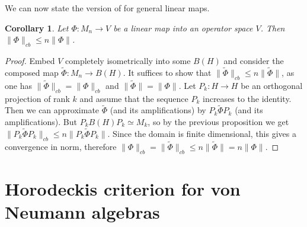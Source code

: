 \documentclass[11pt]{article}
\numberwithin{theorem}{section}
\newtheorem{corollary}[theorem]{Corollary}
\begin{document}
We can now state the version of \cite[Theorem 3.7]{aubrun} for general linear maps.
\begin{corollary}
Let $\Phi:M_n \to V$ be a linear map into an operator space $V$. Then $\|\Phi\|_{cb}\leqslant n \|\Phi\|$.
\end{corollary}
\begin{proof}
Embed $V$ completely isometrically into some $B(H)$ and consider the composed map $\widetilde{\Phi}: M_n \to B(H)$. It suffices to show that $\|\widetilde{\Phi}\|_{cb} \leqslant n \|\widetilde{\Phi}\|$, as one has $\|\widetilde{\Phi}\|_{cb} = \|\Phi\|_{cb}$ and $\|\widetilde{\Phi}\| = \|\Phi\|$. Let $P_{k}: H \to H$ be an orthogonal projection of rank $k$ and assume that the sequence $P_{k}$ increases to the identity. Then we can approximate $\widetilde{\Phi}$ (and its amplifications) by $P_{k}\widetilde{\Phi} P_{k}$ (and its amplifications). But $P_{k} B(H) P_{k} \simeq M_{k}$, so by the previous proposition we get $\|P_{k} \widetilde{\Phi}P_{k}\|_{cb} \leqslant n \|P_{k}\widetilde{\Phi} P_{k}\|$. Since the domain is finite dimensional, this gives a convergence in norm, therefore $\|\Phi\|_{cb}= \|\widetilde{\Phi}\|_{cb} \leqslant n\|\widetilde{\Phi}\| = n \|\Phi\|$.
\end{proof}

\section{Horodeckis criterion for von Neumann algebras}{\label{sec: Horodecki}}

\end{document}
